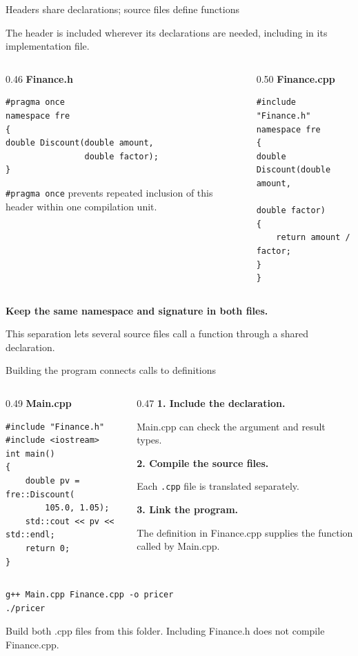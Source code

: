 \documentclass[10pt,aspectratio=169]{beamer}
\newcommand{\intro}[1]{{\small #1\par}}
\begin{document}
\begin{frame}[fragile]{Headers share declarations; source files define functions}
\relax
\intro{The header is included wherever its declarations are needed, including in its implementation file.}
\begin{columns}[T,onlytextwidth]
\begin{column}{0.46\textwidth}
\textbf{Finance.h}
\begin{lstlisting}
#pragma once
namespace fre
{
double Discount(double amount,
                double factor);
}
\end{lstlisting}
\medskip
\texttt{\#pragma once} prevents repeated inclusion of this header within one compilation unit.
\end{column}
\begin{column}{0.50\textwidth}
\textbf{Finance.cpp}
\begin{lstlisting}
#include "Finance.h"
namespace fre
{
double Discount(double amount,
                double factor)
{
    return amount / factor;
}
}
\end{lstlisting}
\end{column}
\end{columns}
\smallskip
\textbf{Keep the same namespace and signature in both files.}\par
{\small This separation lets several source files call a function through a shared declaration.}
\end{frame}

\begin{frame}[fragile]{Building the program connects calls to definitions}
\relax
\begin{columns}[T,onlytextwidth]
\begin{column}{0.49\textwidth}
\textbf{Main.cpp}
\begin{lstlisting}
#include "Finance.h"
#include <iostream>
int main()
{
    double pv = fre::Discount(
        105.0, 1.05);
    std::cout << pv << std::endl;
    return 0;
}
\end{lstlisting}
\end{column}
\begin{column}{0.47\textwidth}
\textbf{1. Include the declaration.}\par
Main.cpp can check the argument and result types.
\medskip\par
\textbf{2. Compile the source files.}\par
Each \texttt{.cpp} file is translated separately.
\medskip\par
\textbf{3. Link the program.}\par
The definition in Finance.cpp supplies the function called by Main.cpp.
\end{column}
\end{columns}
\begin{lstlisting}[language={}]
g++ Main.cpp Finance.cpp -o pricer
./pricer
\end{lstlisting}
{\small Build both .cpp files from this folder. Including Finance.h does not compile Finance.cpp.}
\end{frame}
\end{document}
